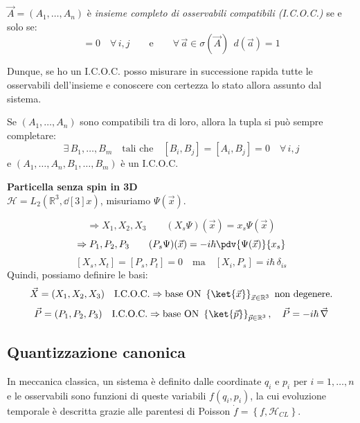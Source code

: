 \begin{definition}
    \label{def: icoc}
    \(\vec{A} = (A_1, \dots, A_n)\) è \textit{insieme completo di osservabili compatibili (I.C.O.C.)} se e solo se:
    \begin{equation}
        [A_i, A_j] = 0 \quad \forall\, i,j \qquad \text{e} \qquad 
            \forall\, \vec{a} \in \sigma(\vec{A}) \ \ d(\vec{a}) = 1
    \end{equation}
\end{definition}
Dunque, se ho un I.C.O.C. posso misurare in successione rapida 
tutte le osservabili dell’insieme e conoscere con certezza lo stato allora assunto dal sistema.

\begin{theorem}
    Se \((A_1, \dots, A_n)\) sono compatibili tra di loro,  
    allora la tupla si può sempre completare:
    \[
        \exists\, B_1, \dots, B_m \quad \text{tali che} \quad [B_i, B_j] = [A_i, B_j] = 0 \quad \forall\, i,j
    \]
    e \((A_1, \dots, A_n, B_1, \dots, B_m)\) è un I.C.O.C.
\end{theorem}


\begin{example}
    \textbf{Particella senza spin in 3D} \\
    \(\mathcal{H}= L_2(\mathbb{R}^3, \dd[3]{x})\), \quad  misuriamo \(\Psi(\vec{x})\).

    \[
        \Rightarrow X_1, X_2, X_3 \qquad (X_s \Psi)(\vec{x}) = x_s \Psi(\vec{x})
    \]
    \[
        \Rightarrow P_1, P_2, P_3 \qquad (P_s \Psi)(\vec{x}) = -i\hbar \pdv{\Psi(\vec{x})}{x_s}
    \]
    \[
        [X_s, X_t]=[P_s, P_t]=0 \quad \text{ma} \quad [X_i, P_s] = i\hbar\,\delta_{is}
    \]
    Quindi, possiamo definire le basi:
    \[
        \vec{X} = (X_1, X_2, X_3) \quad \text{I.C.O.C.} \Rightarrow \text{base ON } \left\{ \ket{\vec{x}} \right\}_{\vec{x}\in \mathbb{R}^3} \text{ non degenere.}
    \]
    \[
        \vec{P} = (P_1, P_2, P_3) \quad \text{I.C.O.C.} \Rightarrow \text{base ON } \left\{ \ket{\vec{p}} \right\}_{\vec{p}\in \mathbb{R}^3}, \quad 
        \vec{P} = -i\hbar\, \vec{\nabla}
    \]
\end{example}


\subsection{Quantizzazione canonica}

In meccanica classica, un sistema è definito dalle coordinate \(q_i\) e \(p_i \) per \(i = 1, \dots, n\) e le osservabili sono funzioni di queste variabili \(f(q_i,p_i)\),
la cui evoluzione temporale è descritta grazie alle parentesi di Poisson \(\dot{f}= \left\{ f, \mathcal{H}_{CL} \right\}\).

